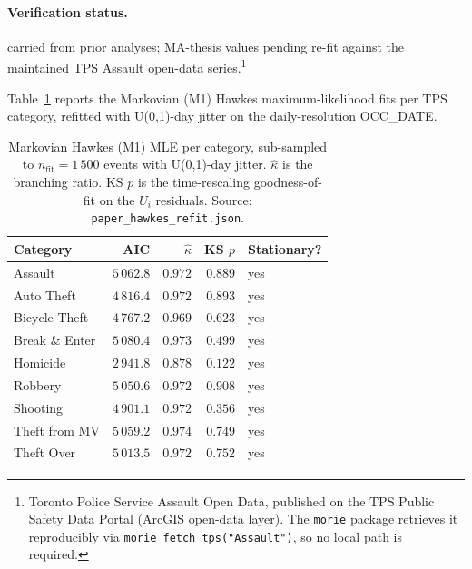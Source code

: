 \documentclass[article,shortnames,nojss]{jss}
\begin{document}
\paragraph*{Verification status.}
carried from prior analyses; MA-thesis values pending re-fit against the maintained TPS Assault open-data series.\footnote{Toronto Police Service Assault Open Data, published on the TPS Public Safety Data Portal (ArcGIS open-data layer). The \texttt{morie} package retrieves it reproducibly via \texttt{morie\_fetch\_tps("Assault")}, so no local path is required.}

Table~\ref{tab:hawkes-markovian} reports the Markovian (M1) Hawkes
maximum-likelihood fits per TPS category, refitted with U(0,1)-day
jitter on the daily-resolution OCC\_DATE.

\begin{table}[h]
\centering\small
\caption{Markovian Hawkes (M1) MLE per category, sub-sampled to
$n_{\mathrm{fit}} = 1\,500$ events with U(0,1)-day jitter.
$\hat\kappa$ is the branching ratio.  KS $p$ is the time-rescaling
goodness-of-fit on the $U_i$ residuals.  Source:
\texttt{paper\_hawkes\_refit.json}.}\label{tab:hawkes-markovian}
\begin{tabular}{lrrrl}
\toprule
Category & AIC & $\hat\kappa$ & KS $p$ & Stationary?\\\midrule
Assault                       & $5\,062.8$ & $0.972$ & $0.889$ & yes\\
Auto Theft                    & $4\,816.4$ & $0.972$ & $0.893$ & yes\\
Bicycle Theft                 & $4\,767.2$ & $0.969$ & $0.623$ & yes\\
Break \& Enter                & $5\,080.4$ & $0.973$ & $0.499$ & yes\\
Homicide                      & $2\,941.8$ & $0.878$ & $0.122$ & yes\\
Robbery                       & $5\,050.6$ & $0.972$ & $0.908$ & yes\\
Shooting                      & $4\,901.1$ & $0.972$ & $0.356$ & yes\\
Theft from MV                 & $5\,059.2$ & $0.974$ & $0.749$ & yes\\
Theft Over                    & $5\,013.5$ & $0.972$ & $0.752$ & yes\\
\bottomrule
\end{tabular}
\end{table}
\end{document}
